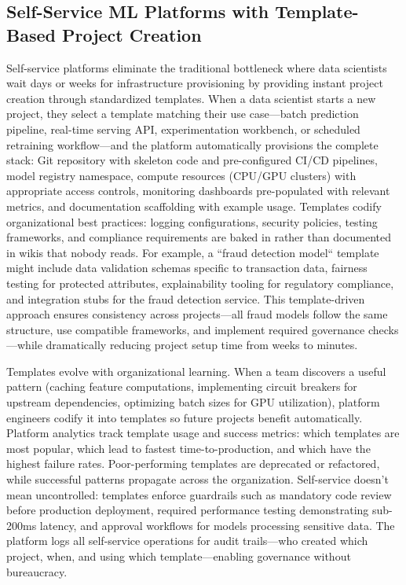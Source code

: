 \subsection{Self-Service ML Platforms with Template-Based Project Creation}

Self-service platforms eliminate the traditional bottleneck where data scientists wait days or weeks for infrastructure provisioning by providing instant project creation through standardized templates. When a data scientist starts a new project, they select a template matching their use case---batch prediction pipeline, real-time serving API, experimentation workbench, or scheduled retraining workflow---and the platform automatically provisions the complete stack: Git repository with skeleton code and pre-configured CI/CD pipelines, model registry namespace, compute resources (CPU/GPU clusters) with appropriate access controls, monitoring dashboards pre-populated with relevant metrics, and documentation scaffolding with example usage. Templates codify organizational best practices: logging configurations, security policies, testing frameworks, and compliance requirements are baked in rather than documented in wikis that nobody reads. For example, a ``fraud detection model`` template might include data validation schemas specific to transaction data, fairness testing for protected attributes, explainability tooling for regulatory compliance, and integration stubs for the fraud detection service. This template-driven approach ensures consistency across projects---all fraud models follow the same structure, use compatible frameworks, and implement required governance checks---while dramatically reducing project setup time from weeks to minutes.

Templates evolve with organizational learning. When a team discovers a useful pattern (caching feature computations, implementing circuit breakers for upstream dependencies, optimizing batch sizes for GPU utilization), platform engineers codify it into templates so future projects benefit automatically. Platform analytics track template usage and success metrics: which templates are most popular, which lead to fastest time-to-production, and which have the highest failure rates. Poor-performing templates are deprecated or refactored, while successful patterns propagate across the organization. Self-service doesn't mean uncontrolled: templates enforce guardrails such as mandatory code review before production deployment, required performance testing demonstrating sub-200ms latency, and approval workflows for models processing sensitive data. The platform logs all self-service operations for audit trails---who created which project, when, and using which template---enabling governance without bureaucracy.

